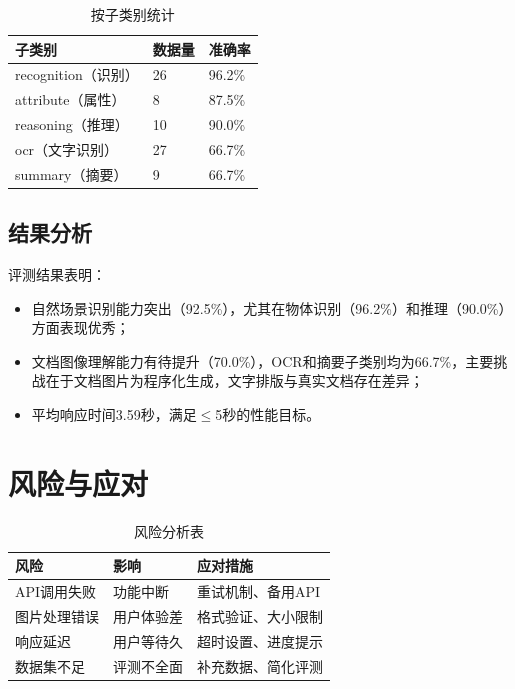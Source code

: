 \begin{table}[htbp]
  \centering
  \caption{按子类别统计}
  \label{tab:eval_subcategory}
  \begin{tabular}{|l|l|l|}
    \hline
    \textbf{子类别} & \textbf{数据量} & \textbf{准确率} \\
    \hline
    recognition（识别） & 26 & 96.2\% \\
    \hline
    attribute（属性） & 8 & 87.5\% \\
    \hline
    reasoning（推理） & 10 & 90.0\% \\
    \hline
    ocr（文字识别） & 27 & 66.7\% \\
    \hline
    summary（摘要） & 9 & 66.7\% \\
    \hline
  \end{tabular}
\end{table}

\subsection{结果分析}

评测结果表明：
\begin{itemize}
  \item 自然场景识别能力突出（92.5\%），尤其在物体识别（96.2\%）和推理（90.0\%）方面表现优秀；
  \item 文档图像理解能力有待提升（70.0\%），OCR和摘要子类别均为66.7\%，主要挑战在于文档图片为程序化生成，文字排版与真实文档存在差异；
  \item 平均响应时间3.59秒，满足$\leq$5秒的性能目标。
\end{itemize}

\section{风险与应对}
\label{sec:risk}

\begin{table}[htbp]
  \centering
  \caption{风险分析表}
  \label{tab:risk}
  \begin{tabular}{|l|l|l|}
    \hline
    \textbf{风险} & \textbf{影响} & \textbf{应对措施} \\
    \hline
    API调用失败 & 功能中断 & 重试机制、备用API \\
    \hline
    图片处理错误 & 用户体验差 & 格式验证、大小限制 \\
    \hline
    响应延迟 & 用户等待久 & 超时设置、进度提示 \\
    \hline
    数据集不足 & 评测不全面 & 补充数据、简化评测 \\
    \hline
  \end{tabular}
\end{table}